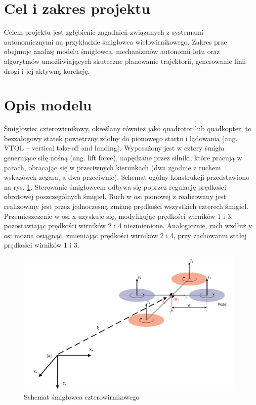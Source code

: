 \documentclass[polish,11pt,a4paper]{article}
\begin{document}
 	\justifying
\section*{Cel i zakres projektu}

Celem projektu jest zgłębienie zagadnień związanych z systemami autonomicznymi na przykładzie śmigłowca wielowirnikowego. Zakres prac obejmuje analizę modelu śmigłowca, mechanizmów autonomii lotu oraz algorytmów umożliwiających skuteczne planowanie trajektorii, generowanie linii drogi i jej aktywną korekcję. 


\section*{Opis modelu}
Śmigłowiec czterowirnikowy, określany również jako quadrotor lub quadkopter, to bezzałogowy statek powietrzny zdolny do pionowego startu i lądowania (ang. VTOL – vertical take-off and landing). Wyposażony jest w cztery śmigła generujące siłę nośną (ang. lift force), napędzane przez silniki, które pracują w parach, obracając się w przeciwnych kierunkach (dwa zgodnie z ruchem wskazówek zegara, a dwa przeciwnie). Schemat ogólny konstrukcji przedstawiono na rys. \ref{fig:model}. Sterowanie śmigłowcem odbywa się poprzez regulację prędkości obrotowej poszczególnych śmigieł. Ruch w osi pionowej z realizowany jest realizowany jest przez jednoczesną zmianę prędkości wszystkich czterech śmigieł. Przemieszczenie w osi x uzyskuje się, modyfikując prędkości wirników 1 i 3, pozostawiając prędkości wirników 2 i 4 niezmienione. Analogicznie, ruch wzdłuż y osi  można osiągnąć, zmieniając prędkości wirników 2 i 4, przy zachowaniu stałej prędkości wirników 1 i 3.

\begin{figure}[H]
	\centering
	\includegraphics[width=0.7\linewidth]{model}
	\caption{Schemat śmigłowca czterowirnikowego}
	\label{fig:model}
\end{figure}
\end{document}

